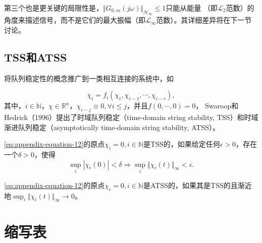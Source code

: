 \begin{translation}
第三个也是更关键的局限性是，$\Vert G_{0,m}(j\omega) \Vert_{\mathcal{H}_\infty} \leqslant 1$只能从能量
（即$\mathcal{L}_2$范数）的角度来描述信号，而不是它们的最大振幅（即$\mathcal{L}_\infty$范数）。其详细差异将在下一节讨论。

\subsection{TSS和ATSS}

将队列稳定性的概念推广到一类相互连接的系统中，如

\begin{equation}
  \dot{\chi}_i = f_i(\chi_i, \chi_{i-1}, \cdots, \chi_{i-r}),
  \label{eq:appendix-equation-12}
\end{equation}
其中，$i \in \mathbb{N}$，$\chi \in \mathbb{R}^n$，$\chi_{i-j} \equiv 0, \forall i \leqslant j$，并且$f(0, \cdots, 0) = 0$，
Swaroop和Hedrick（1996）提出了时域队列稳定（time-domain string stability, TSS）和时域渐进队列稳定（asymptotically time-domain string stability, ATSS）。

\begin{definition}[TSS]
  \ref{eq:appendix-equation-12}的原点$\chi_i = 0, i \in \mathbb{N}$是TSS的，如果给定任何$\epsilon > 0$，存在一个$\delta > 0$，使得
  \begin{equation}
    \sup_{i}{|\chi_i(0)|} < \delta \Rightarrow \sup_{i}{\Vert \chi_i(t) \Vert_\infty} < \epsilon.
    \label{eq:appendix-equation-13}
  \end{equation}
  \label{def:appendix-translation-def6}
\end{definition}

\begin{definition}[ATSS]
  \ref{eq:appendix-equation-12}的原点$\chi_i = 0, i \in \mathbb{N}$是ATSS的，如果其是TSS的且渐近地$\sup_{i}{\Vert \chi_i(t) \Vert_\infty} \rightarrow 0$。
  \label{def:appendix-translation-def7}
\end{definition}

\appendix

\section{缩写表}


\end{translation}
